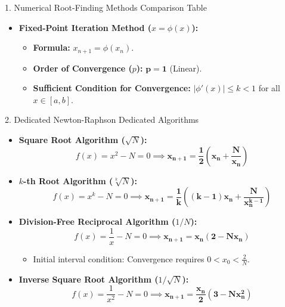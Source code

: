 \documentclass[11pt,a4paper]{article}
\begin{document}
\begin{formulabox}{1. Numerical Root-Finding Methods Comparison Table}
\begin{itemize}
\begin{itemize}
        \item \textbf{Formula:} $x_{n+1} = x_n - \frac{f(x_n)}{f'(x_n)}$.
        \item \textbf{Order of Convergence ($p$):} $\mathbf{p = 2}$ (Quadratic Convergence).
        \item \textbf{Asymptotic Error Relation:} $e_{n+1} \approx \frac{f''(\alpha)}{2f'(\alpha)} e_n^2$.
        \item \textbf{Convergence Condition:} Requires $|f(x) f''(x)| < [f'(x)]^2$ near root and $f'(x) \neq 0$.
    \end{itemize}
    \item \textbf{Fixed-Point Iteration Method ($x = \phi(x)$):}
    \begin{itemize}
        \item \textbf{Formula:} $x_{n+1} = \phi(x_n)$.
        \item \textbf{Order of Convergence ($p$):} $\mathbf{p = 1}$ (Linear).
        \item \textbf{Sufficient Condition for Convergence:} $|\phi'(x)| \le k < 1$ for all $x \in [a, b]$.
    \end{itemize}
\end{itemize}
\end{formulabox}

\vspace{0.2cm}

\begin{defbox}{2. Dedicated Newton-Raphson Dedicated Algorithms}
\begin{itemize}
    \item \textbf{Square Root Algorithm ($\sqrt{N}$):}
    \begin{equation*}
        f(x) = x^2 - N = 0 \implies \mathbf{x_{n+1} = \frac{1}{2}\left(x_n + \frac{N}{x_n}\right)}
    \end{equation*}
    \item \textbf{$k$-th Root Algorithm ($\sqrt[k]{N}$):}
    \begin{equation*}
        f(x) = x^k - N = 0 \implies \mathbf{x_{n+1} = \frac{1}{k}\left((k-1)x_n + \frac{N}{x_n^{k-1}}\right)}
    \end{equation*}
    \item \textbf{Division-Free Reciprocal Algorithm ($1/N$):}
    \begin{equation*}
        f(x) = \frac{1}{x} - N = 0 \implies \mathbf{x_{n+1} = x_n(2 - N x_n)}
    \end{equation*}
    \begin{itemize}
        \item Initial interval condition: Convergence requires $0 < x_0 < \frac{2}{N}$.
    \end{itemize}
    \item \textbf{Inverse Square Root Algorithm ($1/\sqrt{N}$):}
    \begin{equation*}
        f(x) = \frac{1}{x^2} - N = 0 \implies \mathbf{x_{n+1} = \frac{x_n}{2}(3 - N x_n^2)}
    \end{equation*}
\end{itemize}
\end{defbox}
\end{document}
